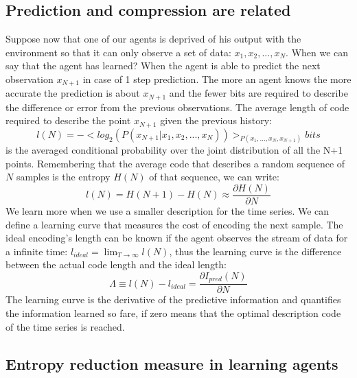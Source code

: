 \subsection{Prediction and compression are related}
Suppose now that one of our agents is deprived of his output with the environment
 so that it can only observe a set of data: $x_{1},x_{2},...,x_{N}$. When we can
 say that the agent has learned? When the agent is able to predict the next
observation $x_{N+1}$ in case of 1 step prediction. The more an agent knows
the more accurate the prediction is about $x_{N+1}$ and the fewer bits are
required to describe the difference or error from the previous observations.
The average length of code required to describe the point $x_{N+1}$ given
the previous history:
\begin{equation}
 l(N)=-<log_2(P(x_{N+1}|x_1,x_2,...,x_N))>_{P(x_1,...,x_N,x_{N+1})} bits
\end{equation}
is the averaged conditional probability over the joint distribution of all the
 N+1 points. Remembering that the average code that describes a random sequence
 of $N$ samples is the entropy $H(N)$ of that sequence, we can write:
\begin{equation}
 l(N)=H(N+1)-H(N)\approx \frac{\partial H(N)}{\partial N}
\end{equation}
We learn more when we use a smaller description for the time series.
We can define a learning curve that measures the cost of encoding the next sample.
The ideal encoding's length can be known if the agent observes the stream of
 data for a infinite time:
$l_{ideal}=\lim_{T\rightarrow \infty} l(N)$,
thus the learning curve is the difference between the actual code length and the ideal length:
\begin{equation}
\varLambda \equiv l(N)-l_{ideal}=\frac{\partial I_{pred}(N)}{\partial N}
\end{equation}
The learning curve is the derivative of the predictive information and quantifies the
information learned so fare, if zero means that the optimal description code of the time series
is reached.

\subsection{Entropy reduction measure in learning agents \label{Conclusion:PredictiveBayes}}

